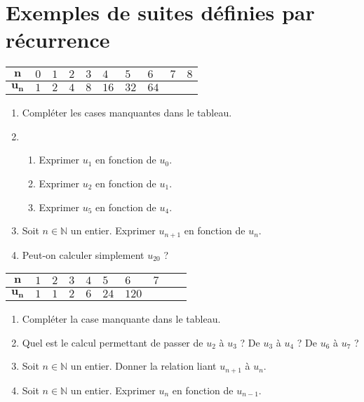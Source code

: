 \documentclass[11pt]{article}
\begin{document}
\section{Exemples de suites définies par récurrence}
\begin{exemple}
  \begin{center}
  \renewcommand{\arraystretch}{2}
  \begin{tabularx}{\textwidth}{|c|Y|Y|Y|Y|Y|Y|Y|Y|Y|}
   \hline
   $\mathbf{n}$ & $0$ & $1$ & $2$ & $3$ & $4$ & $5$ & $6$ & $7$ & $8$ \\
   \hline
   $\mathbf{u_n}$ & $1$ & $2$ & $4$ & $8$ & $16$ & $32$ & $64$ & & \\
   \hline
  \end{tabularx}
  \end{center}
  \begin{enumerate}
    \item Compléter les cases manquantes dans le tableau.
    \item \begin{enumerate}
        \item Exprimer $u_1$ en fonction de $u_0$.
        \item Exprimer $u_2$ en fonction de $u_1$.
        \item Exprimer $u_5$ en fonction de $u_4$.
      \end{enumerate}
    \item Soit $n\in\mathbb{N}$ un entier. Exprimer $u_{n+1}$ en fonction de $u_n$.
    \item Peut-on calculer simplement $u_{20}$ ?
  \end{enumerate}
\end{exemple}

\begin{exemple}
  \begin{center}
  \renewcommand{\arraystretch}{2}
  \begin{tabularx}{\textwidth}{|c|Y|Y|Y|Y|Y|Y|Y|Y|Y|}
   \hline
   $\mathbf{n}$ & $1$ & $2$ & $3$ & $4$ & $5$ & $6$ & $7$ \\
   \hline
   $\mathbf{u_n}$ & $1$ & $1$ & $2$ & $6$ & $24$ & $120$ & \\
   \hline
  \end{tabularx}
  \end{center}
  \begin{enumerate}
    \item Compléter la case manquante dans le tableau.
    \item Quel est le calcul permettant de passer de $u_2$ à $u_3$ ? De
      $u_3$ à $u_4$ ? De $u_6$ à $u_7$ ?
    \item Soit $n\in\mathbb{N}$ un entier. Donner la relation liant
      $u_{n+1}$ à $u_n$.
    \item Soit $n\in\mathbb{N}$ un entier. Exprimer $u_{n}$ en fonction de
      $u_{n-1}$.
  \end{enumerate}
\end{exemple}
\end{document}

